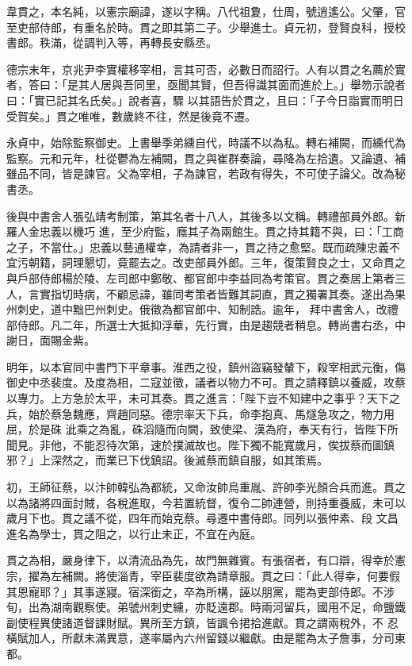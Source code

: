 \begin{pinyinscope}
 韋貫之，本名純，以憲宗廟諱，遂以字稱。八代祖夐，仕周，號逍遙公。父肇，官至吏部侍郎，有重名於時。貫之即其第二子。少舉進士。貞元初，登賢良科，授校書郎。秩滿，從調判入等，再轉長安縣丞。



 德宗末年，京兆尹李實權移宰相，言其可否，必數日而詔行。人有以貫之名薦於實者，答曰：「是其人居與吾同里，亟聞其賢，但吾得識其面而進於上。」舉笏示說者曰：「實已記其名氏矣。」說者喜，驟
 以其語告於貫之，且曰：「子今日詣實而明日受賀矣。」貫之唯唯，數歲終不往，然是後竟不遷。



 永貞中，始除監察御史。上書舉季弟纁自代，時議不以為私。轉右補闕，而纁代為監察。元和元年，杜從鬱為左補闕，貫之與崔群奏論，尋降為左拾遺。又論遺、補雖品不同，皆是諫官。父為宰相，子為諫官，若政有得失，不可使子論父。改為秘書丞。



 後與中書舍人張弘靖考制策，第其名者十八人，其後多以文稱。轉禮部員外郎。新羅人金忠義以機巧
 進，至少府監，廕其子為兩館生。貫之持其籍不與，曰：「工商之子，不當仕。」忠義以藝通權幸，為請者非一，貫之持之愈堅。既而疏陳忠義不宜污朝籍，詞理懇切，竟罷去之。改吏部員外郎。三年，復策賢良之士，又命貫之與戶部侍郎楊於陵、左司郎中鄭敬、都官郎中李益同為考策官。貫之奏居上第者三人，言實指切時病，不顧忌諱，雖同考策者皆難其詞直，貫之獨署其奏。遂出為果州刺史，道中黜巴州刺史。俄徵為都官郎中、知制誥。逾年，
 拜中書舍人，改禮部侍郎。凡二年，所選士大抵抑浮華，先行實，由是趨競者稍息。轉尚書右丞，中謝日，面賜金紫。



 明年，以本官同中書門下平章事。淮西之役，鎮州盜竊發輦下，殺宰相武元衡，傷御史中丞裴度。及度為相，二寇並徵，議者以物力不可。貫之請釋鎮以養威，攻蔡以專力。上方急於太平，未可其奏。貫之進言：「陛下豈不知建中之事乎？天下之兵，始於蔡急魏應，齊趙同惡。德宗率天下兵，命李抱真、馬燧急攻之，物力用屈，於是硃
 泚乘之為亂，硃滔隨而向闕，致使梁、漢為府，奉天有行，皆陛下所聞見。非他，不能忍待次第，速於撲滅故也。陛下獨不能寬歲月，俟拔蔡而圖鎮邪？」上深然之，而業已下伐鎮詔。後滅蔡而鎮自服，如其策焉。



 初，王師征蔡，以汴帥韓弘為都統，又命汝帥烏重胤、許帥李光顏合兵而進。貫之以為諸將四面討賊，各稅進取，今若置統督，復令二帥連營，則持重養威，未可以歲月下也。貫之議不從，四年而始克蔡。尋遷中書侍郎。同列以張仲素、段
 文昌進名為學士，貫之阻之，以行止未正，不宜在內庭。



 貫之為相，嚴身律下，以清流品為先，故門無雜賓。有張宿者，有口辯，得幸於憲宗，擢為左補闕。將使淄青，宰臣裴度欲為請章服。貫之曰：「此人得幸，何要假其恩寵耶？」其事遂寢。宿深銜之，卒為所構，誣以朋黨，罷為吏部侍郎。不涉旬，出為湖南觀察使。弟虢州刺史纁，亦貶遠郡。時兩河留兵，國用不足，命鹽鐵副使程異使諸道督課財賦。異所至方鎮，皆諷令捃拾進獻。貫之謂兩稅外，不
 忍橫賦加人，所獻未滿異意，遂率屬內六州留錢以繼獻。由是罷為太子詹事，分司東都。




\end{pinyinscope}
